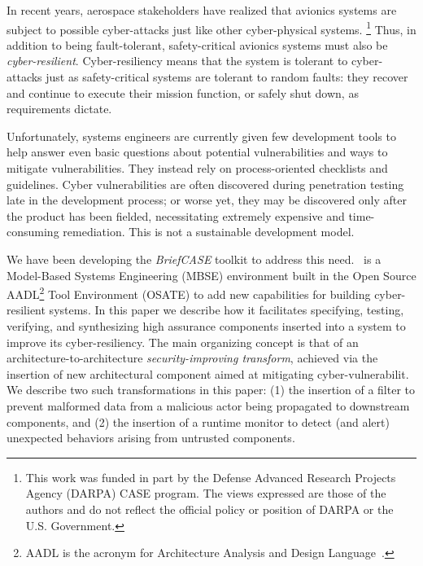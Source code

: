 

In recent years, aerospace stakeholders have realized that avionics
systems are subject to possible cyber-attacks just like other
cyber-physical systems.
%
\footnote{This work was funded in part by the
Defense Advanced Research Projects Agency (DARPA) CASE program.  The views
expressed are those of the authors and do not reflect the official
policy or position of DARPA or the U.S. Government.}
%
Thus, in addition to being fault-tolerant, safety-critical avionics
systems must also be {\em cyber-resilient}.  Cyber-resiliency means
that the system is tolerant to cyber-attacks just as safety-critical
systems are tolerant to random faults: they recover and continue to
execute their mission function, or safely shut down, as requirements
dictate.

Unfortunately, systems engineers are currently given few development
tools to help answer even basic questions about potential
vulnerabilities and ways to mitigate vulnerabilities.  They instead
rely on process-oriented checklists and guidelines.  Cyber
vulnerabilities are often discovered during penetration testing late
in the development process; or worse yet, they may be discovered only
after the product has been fielded, necessitating extremely expensive
and time-consuming remediation. This is not a sustainable development
model.


We have been developing the {\em BriefCASE}  toolkit to address this need.
\brfcs\ is a Model-Based Systems Engineering (MBSE) environment
built in the Open Source AADL\footnote{AADL is the acronym for
Architecture Analysis and Design Language~\cite{aadl}.}  Tool
Environment (OSATE) to add new capabilities for building
cyber-resilient systems. 
%
In this paper we describe how it facilitates specifying, testing,
verifying, and synthesizing high assurance components inserted into a
system to improve its cyber-resiliency.  The main organizing concept
is that of an architecture-to-architecture \emph{security-improving
transform}, achieved via the insertion of  new architectural
component aimed at mitigating  cyber-vulnerabilit.  We describe two
such transformations in this paper: (1) the insertion of a
filter to prevent malformed data from a malicious actor being
propagated to downstream components, and (2) the insertion of a
runtime monitor to detect (and alert) unexpected behaviors arising
from untrusted components. 

